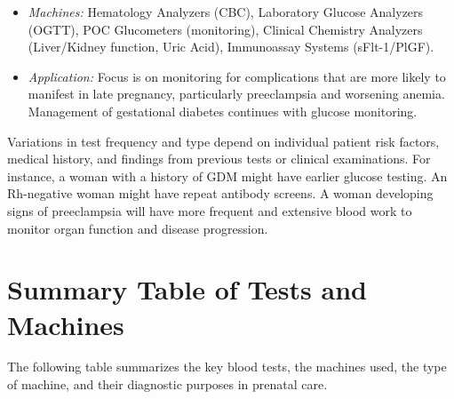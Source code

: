 \documentclass{article}
\begin{document}
\begin{itemize}
\begin{itemize}
\begin{itemize}
        \item \textit{Machines:} Hematology Analyzers (CBC), Laboratory Glucose Analyzers (OGTT), POC Glucometers (monitoring), Clinical Chemistry Analyzers (Liver/Kidney function, Uric Acid), Immunoassay Systems (sFlt-1/PlGF).
        \item \textit{Application:} Focus is on monitoring for complications that are more likely to manifest in late pregnancy, particularly preeclampsia and worsening anemia. Management of gestational diabetes continues with glucose monitoring.
    \end{itemize}
\end{itemize}

Variations in test frequency and type depend on individual patient risk factors, medical history, and findings from previous tests or clinical examinations. For instance, a woman with a history of GDM might have earlier glucose testing. An Rh-negative woman might have repeat antibody screens. A woman developing signs of preeclampsia will have more frequent and extensive blood work to monitor organ function and disease progression.

\section{Summary Table of Tests and Machines}

The following table summarizes the key blood tests, the machines used, the type of machine, and their diagnostic purposes in prenatal care.


\end{itemize}
\end{document}
